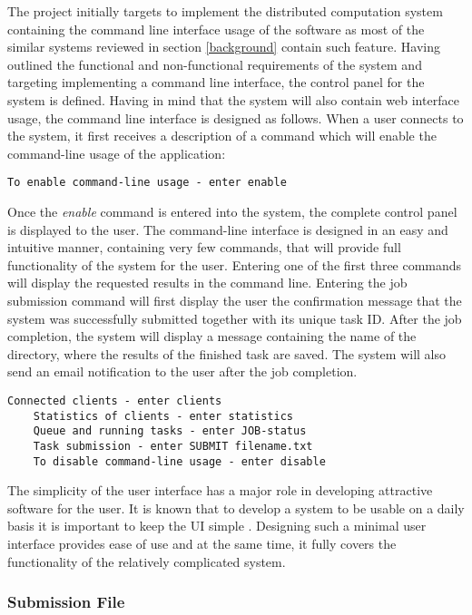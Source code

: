 \documentclass[10pt]{report}
\begin{document}
The project initially targets to implement the distributed computation system containing the command line interface usage of the software as most of the similar systems reviewed in section \ref{background} contain such feature. Having outlined the functional and non-functional requirements of the system and targeting implementing a command line interface, the control panel for the system is defined. Having in mind that the system will also contain web interface usage, the command line interface is designed as follows. When a user connects to the system, it first receives a description of a command which will enable the command-line usage of the application:

\begin{lstlisting}[style=DOS]
    To enable command-line usage - enter enable
\end{lstlisting}

\noindent Once the \textit{enable} command is entered into the system, the complete control panel is displayed to the user. The command-line interface is designed in an easy and intuitive manner, containing very few commands, that will provide full functionality of the system for the user. Entering one of the first three commands will display the requested results in the command line. Entering the job submission command will first display the user the confirmation message that the system was successfully submitted together with its unique task ID. After the job completion, the system will display a message containing the name of the directory, where the results of the finished task are saved. The system will also send an email notification to the user after the job completion.

\begin{lstlisting}[style=DOS]
    Connected clients - enter clients
    Statistics of clients - enter statistics
    Queue and running tasks - enter JOB-status
    Task submission - enter SUBMIT filename.txt
    To disable command-line usage - enter disable
\end{lstlisting}

\noindent The simplicity of the user interface has a major role in developing attractive software for the user. It is known that to develop a system to be usable on a daily basis it is important to keep the UI simple \cite{ui}. Designing such a minimal user interface provides ease of use and at the same time, it fully covers the functionality of the relatively complicated system.

\subsubsection{Submission File}
\end{document}
